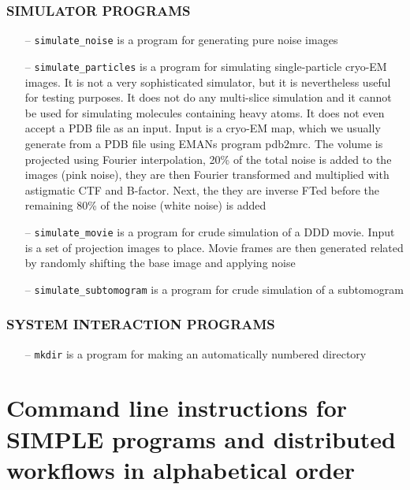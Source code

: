 \documentclass[a4paper,11pt]{article}
\newcommand{\prgname}[1]{\textcolor{NavyBlue}{\texttt{#1}}}
\begin{document}
\subsubsection{SIMULATOR PROGRAMS}
\begin{itemize}
\item[--] \prgname{simulate\_noise} is a program for generating pure noise images
\item[--] \prgname{simulate\_particles} is a program for simulating single-particle cryo-EM images. It is not a very sophisticated simulator, but it is nevertheless useful for testing purposes. It does not do any multi-slice simulation and it cannot be used for simulating molecules containing heavy atoms. It does not even accept a PDB file as an input. Input is a cryo-EM map, which we usually generate from a PDB file using EMANs program pdb2mrc. The volume is projected using Fourier interpolation, 20\% of the total noise is added to the images (pink noise), they are then Fourier transformed and multiplied with astigmatic CTF and B-factor. Next, the they are inverse FTed before the remaining 80\% of the noise (white noise) is added
\item[--] \prgname{simulate\_movie} is a program for crude simulation of a DDD movie. Input is a set of projection images to place. Movie frames are then generated related by randomly shifting the base image and applying noise
\item[--] \prgname{simulate\_subtomogram} is a program for crude simulation of a subtomogram
\end{itemize}

\subsubsection{SYSTEM INTERACTION PROGRAMS}
\begin{itemize}
\item[--] \prgname{mkdir} is a program for making an automatically numbered directory
\end{itemize}

\section{Command line instructions for SIMPLE programs and distributed workflows in alphabetical order}
\end{document}
